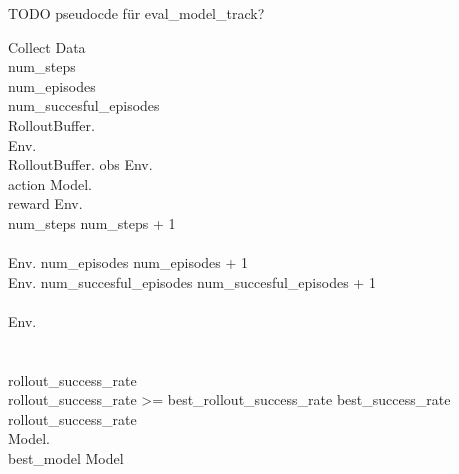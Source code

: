 TODO pseudocde für eval\_model\_track?

\renewcommand{\thepseudonum}{\roman{pseudonum}}
\begin{pseudocode}{Collect Data}{ }
\\

num\_steps \\
num\_episodes \\
num\_succesful\_episodes \\

RolloutBuffer.\\
Env.\\
\WHILE RolloutBuffer. \DO
\BEGIN
obs \GETS Env.\\
action \GETS Model.\\
reward \GETS Env.\\
num\_steps \GETS num\_steps + 1\\
\\
\IF Env. \THEN
\BEGIN
num\_episodes \GETS num\_episodes + 1\\
\IF Env. \THEN
\BEGIN
num\_succesful\_episodes \GETS num\_succesful\_episodes + 1\\
\END\\
Env.\\
\END\\
\END\\

rollout\_success\_rate \GETS {}\\

\IF rollout\_success\_rate >= best\_rollout\_success\_rate \THEN
\BEGIN
best\_success\_rate \GETS rollout\_success\_rate\\
Model.\\
best\_model \GETS Model\\
\END\\


\ENDPROCEDURE
\label{pseudocode:collect_data}
\end{pseudocode}

